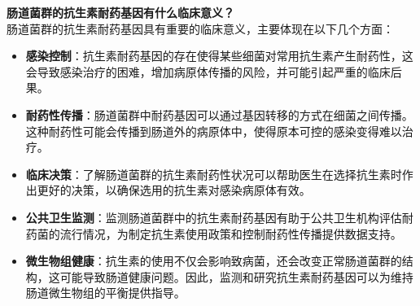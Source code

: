 \documentclass[UTF8]{ctexart}
\begin{document}
\begin{tcolorbox}[
    enhanced,
    colback=lightpurple!10, %
    colframe=white,  %
    arc=3mm,
    boxrule=0.5pt,
    width=\textwidth,
    top=8pt,
    bottom=8pt
]
{\small{\color{lightpurple}\faQuestionCircle}\quad \textbf{肠道菌群的抗生素耐药基因有什么临床意义？}\\
{\color{orange!50}\faComments}\quad 肠道菌群的抗生素耐药基因具有重要的临床意义，主要体现在以下几个方面：
\begin{itemize}
    \item \textbf{感染控制}：抗生素耐药基因的存在使得某些细菌对常用抗生素产生耐药性，这会导致感染治疗的困难，增加病原体传播的风险，并可能引起严重的临床后果。
    \item \textbf{耐药性传播}：肠道菌群中耐药基因可以通过基因转移的方式在细菌之间传播。这种耐药性可能会传播到肠道外的病原体中，使得原本可控的感染变得难以治疗。
    \item \textbf{临床决策}：了解肠道菌群的抗生素耐药性状况可以帮助医生在选择抗生素时作出更好的决策，以确保选用的抗生素对感染病原体有效。
    \item \textbf{公共卫生监测}：监测肠道菌群中的抗生素耐药基因有助于公共卫生机构评估耐药菌的流行情况，为制定抗生素使用政策和控制耐药性传播提供数据支持。
    \item \textbf{微生物组健康}：抗生素的使用不仅会影响致病菌，还会改变正常肠道菌群的结构，这可能导致肠道健康问题。因此，监测和研究抗生素耐药基因可以为维持肠道微生物组的平衡提供指导。
\end{itemize}
}
\end{tcolorbox}

\newpage
\end{document}
